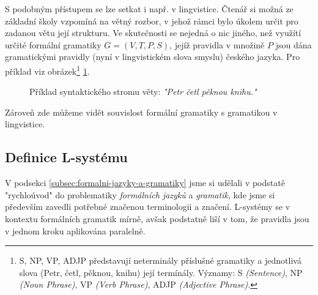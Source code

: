 S podobným přístupem se lze setkat i např. v lingvistice. Čtenář si možná ze základní školy vzpomíná na větný rozbor, v jehož rámci bylo úkolem určit pro zadanou větu její strukturu. Ve skutečnosti se nejedná o nic jiného, než využítí určité formální gramatiky $G=(V,T,P,S)$, jejíž pravidla v množině $P$ jsou dána gramatickými pravidly (nyní v lingvistickém slova smyslu) českého jazyka. Pro příklad viz obrázek\footnote{S, NP, VP, ADJP představují neterminály příslušné gramatiky a jednotlivá slova (Petr, četl, pěknou, knihu) její termínály. Významy: S \emph{(Sentence)}, NP \emph{(Noun Phrase)}, VP \emph{(Verb Phrase)}, ADJP \emph{(Adjective Phrase)}.} \ref{fig:syntax-strom-vety}.
\begin{figure}[h]
    \centering
    \caption{Příklad syntaktického stromu věty: \emph{"Petr četl pěknou knihu."}}
    \label{fig:syntax-strom-vety}
\end{figure}
Zároveň zde můžeme vidět souvislost formální gramatiky s gramatikou v lingvistice.

\subsection{Definice L-systému}\label{subsec:definice-lsystemu}

V podsekci \ref{subsec:formalni-jazyky-a-gramatiky} jsme si udělali v podstatě "rychloúvod" do problematiky \emph{formálních jazyků} a \emph{gramatik}, kde jsme si především zavedli potřebné značenou terminologii a značení. L-systémy se v kontextu formálních gramatik mírně, avšak podstatně liší v tom, že pravidla jsou v jednom kroku aplikována paralelně.


